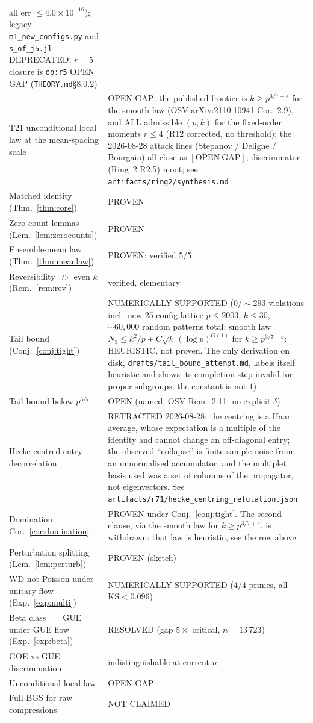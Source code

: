 \documentclass[11pt]{article}
\begin{document}
\begin{center}
\begin{tabular}{ll}
all err $\le 4.0\times 10^{-16}$);
legacy \texttt{m1\_new\_configs.py} and \texttt{s\_of\_j5.jl}
DEPRECATED; $r=5$ closure is \texttt{op:r5} OPEN GAP
(\texttt{THEORY.md}\S 8.0.2)\\
T21 unconditional local law at the
mean-spacing scale & OPEN GAP;
the published frontier is $k\ge p^{3/7+\varepsilon}$ for
the smooth law (OSV arXiv:2110.10941 Cor.~2.9), and
ALL admissible $(p,k)$ for the fixed-order moments
$r\le 4$ (R12 corrected, no threshold);
the 2026-08-28 attack lines (Stepanov / Deligne /
Bourgain) all close as $[\mathrm{OPEN\ GAP}]$;
discriminator (Ring~2 R2.5) moot; see
\texttt{artifacts/ring2/synthesis.md}\\
Matched identity (Thm.~\ref{thm:core}) & PROVEN\\
Zero-count lemmas (Lem.~\ref{lem:zerocounts}) & PROVEN\\
Ensemble-mean law (Thm.~\ref{thm:meanlaw}) & PROVEN; verified 5/5\\
Reversibility $\not\Rightarrow$ even $k$ (Rem.~\ref{rem:rev}) &
verified, elementary\\
Tail bound (Conj.~\ref{conj:tight}) & NUMERICALLY-SUPPORTED
($0/{\sim}293$ violations incl.\ new 25-config lattice $p\le 2003$, $k\le 30$,
$\sim 60{,}000$ random patterns total;
smooth law $N_3 \le k^2/p + C\sqrt{k}\,(\log p)^{O(1)}$ for
$k \ge p^{3/7+\varepsilon}$: HEURISTIC, not proven. The only
derivation on disk, \texttt{drafts/tail\_bound\_attempt.md},
labels itself heuristic and shows its completion step invalid
for proper subgroups; the constant is not $1$)\\
Tail bound below $p^{3/7}$ & OPEN (named, OSV Rem.~2.11: no explicit $\delta$)\\
Hecke-centred entry decorrelation & RETRACTED 2026-08-28: the
centring is a Haar average, whose expectation is a multiple of the
identity and cannot change an off-diagonal entry; the observed
``collapse'' is finite-sample noise from an unnormalised accumulator,
and the multiplet basis used was a set of columns of the propagator,
not eigenvectors. See
\texttt{artifacts/r71/hecke\_centring\_refutation.json}\\
Domination, Cor.~\ref{cor:domination} &
PROVEN under Conj.~\ref{conj:tight}. The second clause, via the
smooth law for $k \ge p^{3/7+\varepsilon}$, is withdrawn: that law
is heuristic, see the row above\\
Perturbation splitting (Lem.~\ref{lem:perturb}) & PROVEN (sketch)\\
WD-not-Poisson under unitary flow (Exp.~\ref{exp:multi}) &
NUMERICALLY-SUPPORTED ($4/4$ primes, all $\mathrm{KS}<0.096$)\\
Beta class $=$ GUE under GUE flow (Exp.~\ref{exp:beta}) &
RESOLVED (gap $5\times$ critical, $n=13\,723$)\\
GOE-vs-GUE discrimination & indistinguishable at current $n$\\
Unconditional local law & OPEN GAP\\
Full BGS for raw compressions & NOT CLAIMED\\
\bottomrule
\end{tabular}
\end{center}
\end{document}
